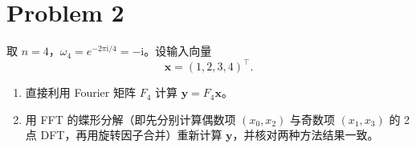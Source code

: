\section*{Problem 2}

取 $n = 4$，$\omega_4 = e^{-2\pi \mathrm{i}/4} = -\mathrm{i}$。设输入向量
\[
    \bm{x} = \left(1, 2, 3, 4\right)^\top.
\]

\begin{enumerate}
    \item 直接利用 Fourier 矩阵 $F_4$ 计算 $\bm{y} = F_4 \bm{x}$。
    \item 用 FFT 的蝶形分解（即先分别计算偶数项 $\left(x_0, x_2\right)$ 与奇数项 $\left(x_1, x_3\right)$ 的 2 点 DFT，再用旋转因子合并）重新计算 $\bm{y}$，并核对两种方法结果一致。
\end{enumerate}

